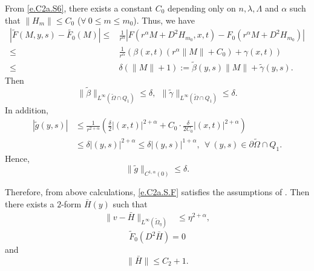 \documentclass[preprint,12pt]{elsarticle}
\theoremstyle{definition}
\theoremstyle{remark}
\numberwithin{equation}{section}
\begin{document}
From \cref{e.C2a.S6}, there exists a constant $C_0$ depending only on $n,\lambda,\Lambda$ and $\alpha$ such that $\|H_m\|\leq C_0$ ($\forall~0\leq m\leq m_0$). Thus, we have
\begin{equation*}
  \begin{aligned}
    |\tilde{F}(M,y,s)-\tilde{F_0}(M)|\leq& \frac{1}{r^{\alpha}}
    \left|F(r^{\alpha}M+D^2 H_{m_0},x,t)-F_0(r^{\alpha}M+D^2 H_{m_0})\right|\\
    \leq& \frac{1}{r^{\alpha}}\left(\beta(x,t)\left(r^{\alpha}\|M\|+C_0\right)
    +\gamma(x,t)\right)\\
    \leq& \delta \left(\|M\|+1\right)
    :=\tilde{\beta}(y,s)\|M\|+\tilde{\gamma}(y,s).
  \end{aligned}
\end{equation*}
Then
\begin{equation*}
\|\tilde{\beta}\|_{L^{\infty}(\tilde{\Omega}\cap Q_1)} \leq \delta,~~
\|\tilde{\gamma}\|_{L^{\infty}(\tilde{\Omega}\cap Q_1)} \leq \delta.
\end{equation*}
In addition,
\begin{equation*}
\begin{aligned}
|\tilde{g}(y,s)|
&\leq \frac{1}{r^{2+\alpha}}\left(\frac{\delta}{2}|(x,t)|^{2+\alpha}+
C_0\cdot \frac{\delta}{2C_0}|(x,t)|^{2+\alpha}\right)\\
&\leq  \delta |(y,s)|^{2+\alpha}\leq \delta |(y,s)|^{1+\alpha},~~\forall ~(y,s)\in \partial \tilde{\Omega}\cap Q_{1}.
\end{aligned}
\end{equation*}
Hence,
\begin{equation*}
  \|\tilde{g}\|_{C^{1,\alpha}(0)}\leq \delta.
\end{equation*}

Therefore, from above calculations, \cref{e.C2a.S.F} satisfies the assumptions of . Then there exists a $2$-form $\bar H (y)$ such that
\begin{equation*}
\begin{aligned}
    \|v-\bar H\|_{L^{\infty }(\tilde{\Omega} _{\eta})}&\leq \eta ^{2+\alpha},
\end{aligned}
\end{equation*}
\begin{equation*}
\tilde{F}_0(D^2 \bar H)=0
\end{equation*}
and
\begin{equation*}
\|\bar H\|\leq C_2+1.
\end{equation*}
\end{document}
